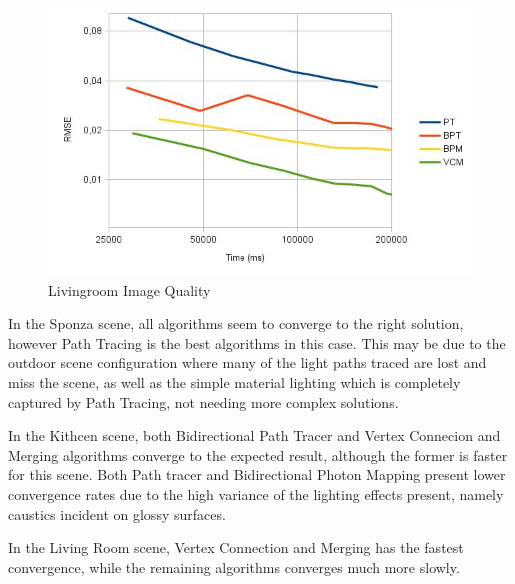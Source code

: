 \begin{figure}[H]
\includegraphics[width=\linewidth]{img/livingroomImgq.jpg}
\caption{\label{img:livingroomImgq} Livingroom Image Quality}
\end{figure}

In the Sponza scene, all algorithms seem to converge to the right solution, however Path Tracing is the best algorithms in this case. This may be due to the outdoor scene configuration where many of the light paths traced are lost and miss the scene, as well as the simple material lighting which is completely captured by Path Tracing, not needing more complex solutions.

In the Kithcen scene, both Bidirectional Path Tracer and Vertex Connecion and Merging algorithms converge to the expected result, although the former is faster for this scene. Both Path tracer and Bidirectional Photon Mapping present lower convergence rates due to the high variance of the lighting effects present, namely caustics incident on glossy surfaces.

In the Living Room scene, Vertex Connection and Merging has the fastest convergence, while the remaining algorithms converges much more slowly.
